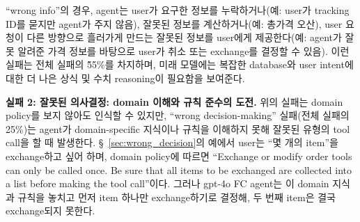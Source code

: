 \documentclass{article}
\begin{document}
``wrong info''의 경우, agent는 user가 요구한 정보를 누락하거나(예: user가 tracking ID를 묻지만 agent가 주지 않음), 잘못된 정보를 계산하거나(예: 총가격 오산), user 요청이 다른 방향으로 흘러가게 만드는 잘못된 정보를 user에게 제공한다(예: agent가 잘못 알려준 가격 정보를 바탕으로 user가 취소 또는 exchange를 결정할 수 있음). 이런 실패는 전체 실패의 \~55\%를 차지하며, 미래 모델에는 복잡한 database와 user intent에 대한 더 나은 상식 및 수치 reasoning이 필요함을 보여준다.


\textbf{실패 2: 잘못된 의사결정: domain 이해와 규칙 준수의 도전.} 위의 실패는 domain policy를 보지 않아도 인식할 수 있지만, ``wrong decision-making'' 실패(전체 실패의 25\%)는 agent가 domain-specific 지식이나 규칙을 이해하지 못해 잘못된 유형의 tool call을 할 때 발생한다. \S~\ref{sec:wrong_decision}의 예에서 user는 ``몇 개의 item''을 exchange하고 싶어 하며, domain policy에 따르면 ``Exchange or modify order tools can only be called once. Be sure that all items to be exchanged are collected into a list before making the tool call''이다. 그러나 gpt-4o FC agent는 이 domain 지식과 규칙을 놓치고 먼저 item 하나만 exchange하기로 결정해, 두 번째 item은 결국 exchange되지 못한다.
\end{document}
